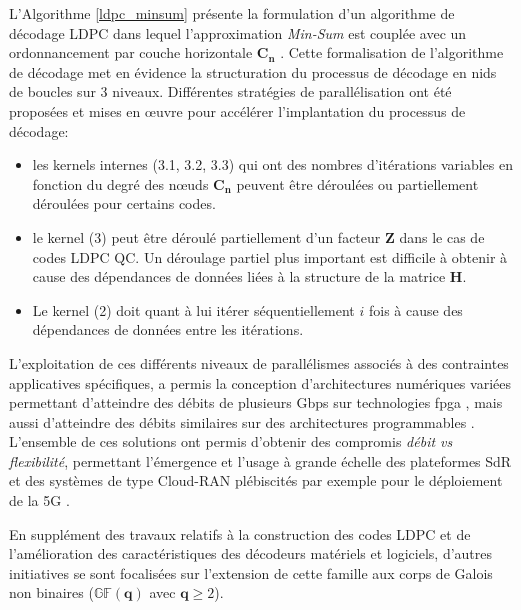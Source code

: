 \documentclass[../main.tex]{subfiles}
\begin{document}
L’Algorithme \ref{ldpc_minsum} présente la formulation d’un algorithme de décodage LDPC dans lequel l’approximation \textit{Min-Sum} est couplée avec un ordonnancement par couche horizontale $\bm{C_n}$ \cite{LDPC:HL}. Cette formalisation de l’algorithme de décodage met en évidence la structuration du processus de décodage en nids de boucles sur 3 niveaux. Différentes stratégies de parallélisation ont été proposées et mises en œuvre pour accélérer l’implantation du processus de décodage:
\begin{itemize}
    \item les kernels internes (3.1, 3.2, 3.3) qui ont des nombres d'itérations variables en fonction du degré des nœuds $\bm{C_n}$ peuvent être déroulées ou partiellement déroulées pour certains codes.
    \item le kernel (3) peut être déroulé partiellement d’un facteur \textbf{Z} dans le cas de codes LDPC QC. Un déroulage partiel plus important est difficile à obtenir à cause des dépendances de données liées à la structure de la matrice \textbf{H}.
    \item Le kernel (2) doit quant à lui itérer séquentiellement $\mathit{i}$ fois à cause des dépendances de données entre les itérations. 
\end{itemize}

L'exploitation de ces différents niveaux de parallélismes associés à des contraintes applicatives spécifiques, a permis la conception d’architectures numériques variées permettant d’atteindre des débits de plusieurs Gbps sur technologies \acrshort{fpga} \cite{PIGNOLY:MS,BOUTILLON}, mais aussi d’atteindre des débits similaires sur des architectures programmables \cite{LDPC:SOFT4,FAIR:LDPC}. \\
L’ensemble de ces solutions ont permis d'obtenir des compromis \textit{débit vs flexibilité}, permettant l’émergence et l’usage à grande échelle des plateformes SdR \cite{SDR, SURVEY:SDR} et des systèmes de type Cloud-RAN \cite{CLOUD:RAN2,CLOUD:RAN3} plébiscités par exemple pour le déploiement de la 5G \cite{CLOUD:RAN1}. 

En supplément des travaux relatifs à la construction des codes LDPC et de l’amélioration des caractéristiques des décodeurs matériels et logiciels, d’autres initiatives se sont focalisées sur l’extension de cette famille aux corps de Galois non binaires ($\mathbb{GF}( \bm{q} )$ avec $\bm{q}\ge2$).

% 
% 
% 
% 
\end{document}
